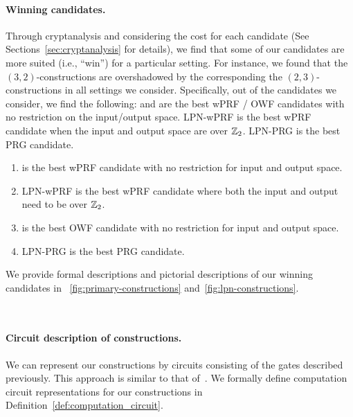\paragraph{Winning candidates.}
Through cryptanalysis and considering the cost for each candidate (See Sections~\ref{sec:cryptanalysis} for details), we find that some of our candidates are more suited (i.e., ``win'') for a particular setting. For instance, we found that the $(3,2)$-constructions are overshadowed by the corresponding the $(2,3)$-constructions in all settings we consider. Specifically, out of the candidates we consider, we find the following: \ttwPRF and \ttOWF are the best wPRF / OWF candidates with no restriction on the input/output space. LPN-wPRF is the best wPRF candidate when the input and output space are over $\mathbb{Z}_2$. LPN-PRG is the best PRG candidate.
\iffull
\begin{enumerate}
    \item \ttwPRF is the best wPRF candidate with no restriction for input and output space. 
    \item LPN-wPRF is the best wPRF candidate where both the input and output need to be over $\mathbb{Z}_2$.
    \item \ttOWF is the best OWF candidate with no restriction for input and output space.
    \item LPN-PRG is the best PRG candidate.
\end{enumerate}
\fi
We provide formal descriptions and pictorial descriptions of our winning candidates in \fig~\ref{fig:primary-constructions} and~\ref{fig:lpn-constructions}.


~


\iffull
\paragraph{Circuit description of constructions.}
We can represent our constructions by circuits consisting of the gates described previously. This approach is similar to that of~\cite{boyle2019-fss-preprocess}. We formally define computation circuit representations for our constructions in Definition~\ref{def:computation_circuit}.

